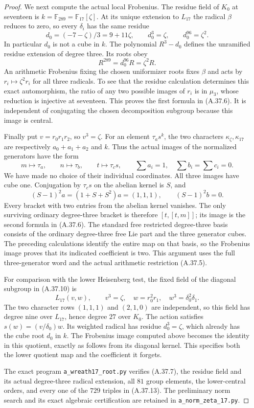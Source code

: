 \begin{proof}
We next compute the actual local Frobenius. The
residue field of $K_0$ at seventeen is
$k=\mathbb F_{289}=\mathbb F_{17}[\zeta]$.
At its unique extension to $L_{17}$ the radical
$\beta$ reduces to zero, so every $\delta_i$ has
the same residue
\[
 d_0=(-7-\zeta)/3=9+11\zeta,\qquad
 d_0^3=\zeta,\qquad d_0^{96}=\zeta^2.
 \tag{A.37.11}
\]
In particular $d_0$ is not a cube in $k$.
The polynomial $R^3-d_0$ defines the unramified
residue extension of degree three. Its roots obey
\[
                       R^{289}=d_0^{96}R=\zeta^2R.
 \tag{A.37.12}
\]
An arithmetic Frobenius fixing the chosen uniformizer
roots fixes $\beta$ and acts by $r_i\mapsto\zeta^2r_i$
for all three radicals. To see that the residue
calculation determines this exact automorphism,
the ratio of any two possible images of $r_i$ is
in $\mu_3$, whose reduction is injective at seventeen.
This proves the first formula in (A.37.6).
It is independent of conjugating the chosen
decomposition subgroup because this image is central.

Finally put $v=r_0r_1r_2$, so $v^3=\zeta$.
For an element $\tau_as^k$, the two characters
$\kappa_\zeta,\kappa_{17}$ are respectively
$a_0+a_1+a_2$ and $k$. Thus the actual images of
the normalized generators have the form
\[
 m\mapsto\tau_a,\qquad n\mapsto\tau_b,
 \qquad t\mapsto\tau_cs,
 \qquad \sum a_i=1,\quad\sum b_i=\sum c_i=0.
 \tag{A.37.13}
\]
We have made no choice of their individual coordinates.
All three images have cube one. Conjugation by
$\tau_cs$ on the abelian kernel is $S$, and
\[
 (S-1)^2a=(1+S+S^2)a=(1,1,1),\qquad
                         (S-1)^2b=0.
 \tag{A.37.14}
\]
Every bracket with two entries from the abelian
kernel vanishes. The only surviving ordinary
degree-three bracket is therefore $[t,[t,m]]$;
its image is the second formula in (A.37.6).
The standard free restricted degree-three basis
consists of the ordinary degree-three free Lie
part and the three generator cubes. The preceding
calculations identify the entire map on that basis,
so the Frobenius image proves that its indicated
coefficient is two. This argument uses the full
three-generator word and the actual arithmetic
restriction (A.37.5).

For comparison with the lower Heisenberg test, the
fixed field of the diagonal subgroup in (A.37.10)
is
\[
 L_{17}(v,w),\qquad
 v^3=\zeta,\quad w=r_0^2r_1,\quad
 w^3=\delta_0^2\delta_1.
 \tag{A.37.15}
\]
The two character rows $(1,1,1)$ and $(2,1,0)$
are independent, so this field has degree nine
over $L_{17}$, hence degree $27$ over $K_0$.
The action satisfies $s(w)=(v/\delta_0)w$.
Its weighted radical has residue $d_0^3=\zeta$,
which already has the cube root $d_0$ in $k$.
The Frobenius image computed above becomes the
identity in this quotient, exactly as follows
from its diagonal kernel. This specifies both
the lower quotient map and the coefficient it
forgets.

The exact program \texttt{a\_wreath17\_root.py}
verifies (A.37.7), the residue field and its actual
degree-three radical extension, all $81$ group
elements, the lower-central orders, and every one
of the $729$ triples in (A.37.13). The preliminary
norm search and its exact algebraic certification
are retained in \texttt{a\_norm\_zeta\_17.py}.
\end{proof}

